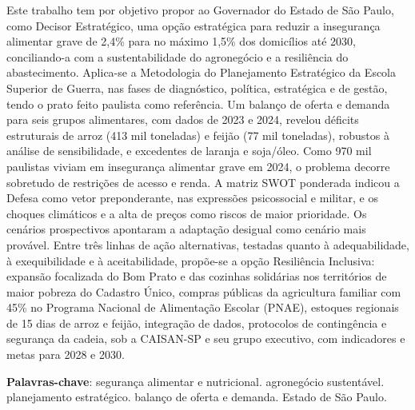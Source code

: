 \documentclass[
	12pt,				%
	openright,			%
	oneside,			%
	a4paper,			%
	chapter=TITLE,		%
	section=TITLE,		%
	english,			%
	french,				%
	spanish,			%
	brazil,				%
 ]{abntex2}
\begin{document}
\setlength{\absparsep}{18pt} %
\begin{resumo}
Este trabalho tem por objetivo propor ao Governador do Estado de São Paulo,
como Decisor Estratégico, uma opção estratégica para reduzir a insegurança
alimentar grave de 2,4\% para no máximo 1,5\% dos domicílios até 2030,
conciliando-a com a sustentabilidade do agronegócio e a resiliência do
abastecimento. Aplica-se a Metodologia do Planejamento Estratégico da Escola
Superior de Guerra, nas fases de diagnóstico, política, estratégica e de gestão,
tendo o prato feito paulista como referência. Um balanço de oferta e demanda
para seis grupos alimentares, com dados de 2023 e 2024, revelou déficits
estruturais de arroz (413 mil toneladas) e feijão (77 mil toneladas), robustos à
análise de sensibilidade, e excedentes de laranja e soja/óleo. Como 970 mil
paulistas viviam em insegurança alimentar grave em 2024, o problema decorre
sobretudo de restrições de acesso e renda. A matriz SWOT ponderada indicou a
Defesa como vetor preponderante, nas expressões psicossocial e militar, e os
choques climáticos e a alta de preços como riscos de maior prioridade. Os
cenários prospectivos apontaram a adaptação desigual como cenário mais provável.
Entre três linhas de ação alternativas, testadas quanto à adequabilidade, à
exequibilidade e à aceitabilidade, propõe-se a opção Resiliência Inclusiva:
expansão focalizada do Bom Prato e das cozinhas solidárias nos territórios de
maior pobreza do Cadastro Único, compras públicas da agricultura familiar com
45\% no Programa Nacional de Alimentação Escolar (PNAE), estoques regionais de 15 dias de arroz e feijão, integração de
dados, protocolos de contingência e segurança da cadeia, sob a CAISAN-SP e seu
grupo executivo, com indicadores e metas para 2028 e 2030.

\noindent
\textbf{Palavras-chave}: segurança alimentar e nutricional. agronegócio sustentável.
planejamento estratégico. balanço de oferta e demanda. Estado de São Paulo.
\end{resumo}
\end{document}
